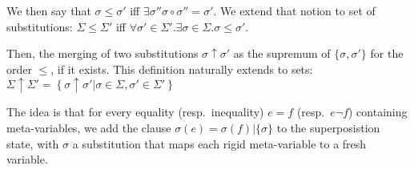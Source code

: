 We then say that $\sigma \leq \sigma'$ iff $\exists \sigma'' \sigma \circ \sigma'' = \sigma'$.
We extend that notion to set of substitutions:
$\Sigma \leq \Sigma'$ iff $\forall \sigma' \in \Sigma'. \exists \sigma \in \Sigma. \sigma \leq \sigma'$.

Then, the merging of two substitutions $\sigma \uparrow \sigma'$ as the supremum of $\{\sigma,\sigma'\}$
for the order $\leq$, if it exists. This definition naturally extends to sets:
$\Sigma \uparrow \Sigma' = \left\{ \sigma \uparrow \sigma' | \sigma \in \Sigma, \sigma' \in \Sigma' \right\}$


The idea is that for every equality (resp.~inequality) $e = f$ (resp.~$e \neg f$) containing meta-variables,
we add the clause $\sigma(e) = \sigma(f) | \{ \sigma \}$ to the superposistion state, with
$\sigma$ a substitution that maps each rigid meta-variable to a fresh variable.


